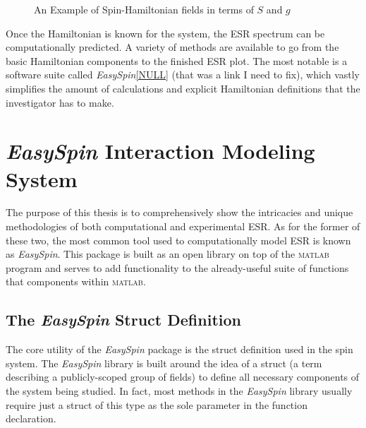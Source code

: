 \documentclass[oneside, astronomy, noacknowlegments]{BYUPhys}
\begin{document}
\begin{figure}
    \caption[Example of spin-hamiltonion fields]{\label{fig:HamFields}
     An Example of Spin-Hamiltonian fields in terms of $S$ and $g$}
 \end{figure}

Once the Hamiltonian is known for the system, the ESR spectrum can be computationally predicted. A variety of methods are available to go from the basic Hamiltonian components to the finished ESR plot. The most notable is a software suite called \textit{EasySpin}\ref{NULL} (that was a link I need to fix), which vastly simplifies the amount of calculations and explicit Hamiltonian definitions that the investigator has to make.

\section{\textit{EasySpin} Interaction Modeling System}

The purpose of this thesis is to comprehensively show the intricacies and unique methodologies of both computational and experimental ESR. As for the former of these two, the most common tool used to computationally model ESR is known as \textit{EasySpin}. This package is built as an open library on top of the \textsc{matlab} program and serves to add functionality to the already-useful suite of functions that components within \textsc{matlab}.

\subsection{The \textit{EasySpin} Struct Definition}

The core utility of the \textit{EasySpin} package is the struct definition used in the spin system. The \textit{EasySpin} library is built around the idea of a struct (a term describing a publicly-scoped group of fields) to define all necessary components of the system being studied. In fact, most methods in the \textit{EasySpin} library usually require just a struct of this type as the sole parameter in the function declaration.
\end{document}
